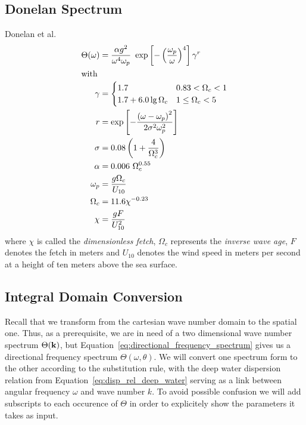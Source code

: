 \subsection{Donelan Spectrum}
%
Donelan et al. \cite{article:Donelan1985}
\begin{subequations}
\begin{align}
 \Theta(\omega) &= \frac{\alpha
g^2}{\omega^4\omega_p}~\exp\left[-\left(\frac{\omega_p}{\omega}
\right)^4\right]\gamma^r\\
\intertext{with}
\gamma &= \begin{cases}
	1.7 & 0.83 < \Omega_c < 1\\
	1.7 + 6.0\lg{\Omega_c} & 1\leq\Omega_c < 5
	\end{cases}\\
r &= \exp\left[-\frac{\left(\omega -
\omega_p\right)^2}{2\sigma^2\omega_p^2}\right] \\
\sigma &= 0.08\left(1 + \frac{4}{\Omega_c^3}\right)\\
\alpha &= 0.006~\Omega_c^{0.55} \\
\omega_{p} &= \frac{g\Omega_c}{U_{10}}\\
\Omega_c &= 11.6\chi^{-0.23}\\
\chi &= \frac{gF}{U_{10}^{2}}
\end{align}
\end{subequations}
where $\chi$ is called the \emph{dimensionless fetch}, $\Omega_c$ represents 
the \emph{inverse wave age}, $F$ denotes the fetch in meters and $U_{10}$ 
denotes the wind speed in meters per second at a height of ten meters above the 
sea surface.

\subsection{Integral Domain Conversion}
%
Recall that we transform from the cartesian wave number domain to the spatial 
one. Thus, as a prerequisite, we are in need of a two dimensional wave number 
spectrum $\Theta(\mathbf{k})$, but 
Equation~\ref{eq:directional_frequency_spectrum} 
gives us a directional frequency spectrum $\Theta(\omega,\theta)$. We will 
convert one spectrum form to the other according to the substitution rule, with 
the deep water dispersion relation from Equation~\ref{eq:disp_rel_deep_water} 
serving as a link between angular frequency $\omega$ and wave number $k$. To 
avoid possible confusion we will add subscripts to each occurence of $\Theta$ 
in order to explicitely show the parameters it takes as input.\\

